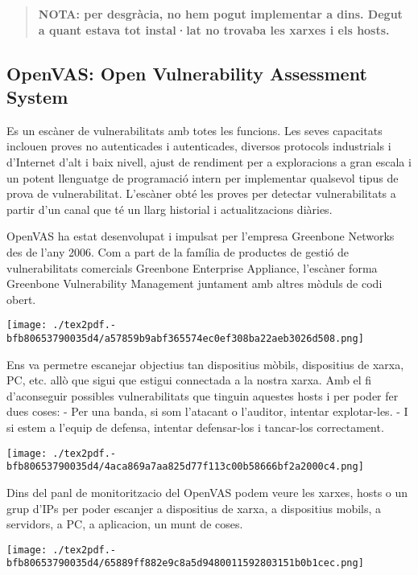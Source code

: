 \documentclass[]{article}
\begin{document}
\begin{quote}
\textbf{NOTA: per desgràcia, no hem pogut implementar a dins. Degut a
quant estava tot instal·lat no trovaba les xarxes i els hosts.}
\end{quote}

\hypertarget{openvas-open-vulnerability-assessment-system}{%
\subsection{\texorpdfstring{\textbf{OpenVAS}: Open Vulnerability
Assessment
System}{OpenVAS: Open Vulnerability Assessment System}}\label{openvas-open-vulnerability-assessment-system}}

Es un escàner de vulnerabilitats amb totes les funcions. Les seves
capacitats inclouen proves no autenticades i autenticades, diversos
protocols industrials i d'Internet d'alt i baix nivell, ajust de
rendiment per a exploracions a gran escala i un potent llenguatge de
programació intern per implementar qualsevol tipus de prova de
vulnerabilitat. L'escàner obté les proves per detectar vulnerabilitats a
partir d'un canal que té un llarg historial i actualitzacions diàries.

OpenVAS ha estat desenvolupat i impulsat per l'empresa Greenbone
Networks des de l'any 2006. Com a part de la família de productes de
gestió de vulnerabilitats comercials Greenbone Enterprise Appliance,
l'escàner forma Greenbone Vulnerability Management juntament amb altres
mòduls de codi obert.

\texttt{[image: ./tex2pdf.-bfb80653790035d4/a57859b9abf365574ec0ef308ba22aeb3026d508.png]}

Ens va permetre escanejar objectius tan dispositius mòbils, dispositius
de xarxa, PC, etc. allò que sigui que estigui connectada a la nostra
xarxa. Amb el fi d'aconseguir possibles vulnerabilitats que tinguin
aquestes hosts i per poder fer dues coses: - Per una banda, si som
l'atacant o l'auditor, intentar explotar-les. - I si estem a l'equip de
defensa, intentar defensar-los i tancar-los correctament.

\texttt{[image: ./tex2pdf.-bfb80653790035d4/4aca869a7aa825d77f113c00b58666bf2a2000c4.png]}

Dins del panl de monitoritzacio del OpenVAS podem veure les xarxes,
hosts o un grup d'IPs per poder escanjer a dispositius de xarxa, a
dispositius mobils, a servidors, a PC, a aplicacion, un munt de coses.

\texttt{[image: ./tex2pdf.-bfb80653790035d4/65889ff882e9c8a5d9480011592803151b0b1cec.png]}
\end{document}

